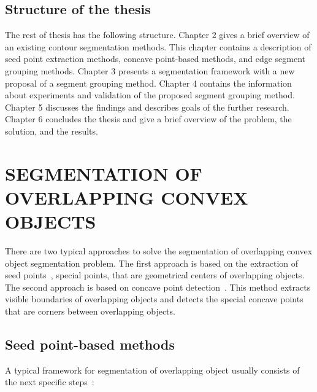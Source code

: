 \documentclass{lutmscthesis}[2010/09/22]
\begin{document}
\subsection{Structure of the thesis}

The rest of thesis has the following structure. Chapter 2 gives a brief overview of an existing contour segmentation methods. This chapter contains a description of seed point extraction methods, concave point-based methods, and edge segment grouping methods. Chapter 3 presents a segmentation framework with a new proposal of a segment grouping method. Chapter 4 contains the information about experiments and validation of the proposed segment grouping method. Chapter 5 discusses the findings and describes goals of the further research. Chapter 6 concludes the thesis and give a brief overview of the problem, the solution, and the results.


\section{SEGMENTATION OF OVERLAPPING CONVEX OBJECTS}
\label{sec:related}

There are two typical approaches to solve the segmentation of overlapping convex object segmentation problem. The first approach is based on the extraction of seed points~\cite{zafari-thesis}, special points, that are geometrical centers of overlapping objects. The second approach is based on concave point detection~\cite{Zafari15}. This method extracts visible boundaries of overlapping objects and detects the special concave points that are corners between overlapping objects.  

\subsection{Seed point-based methods}
A typical framework for segmentation of overlapping object usually consists of the next specific steps~\cite{zafari-thesis}:
\end{document}
